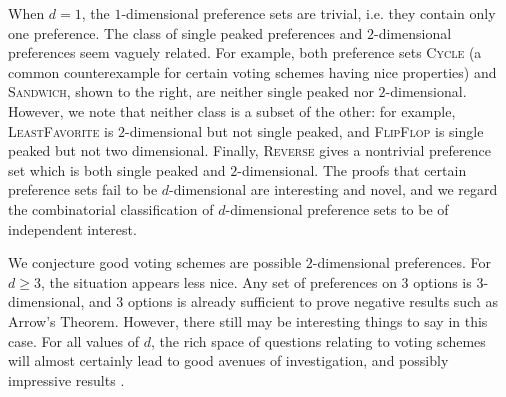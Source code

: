 \documentclass[12pt]{article}
\newcommand{\1}[1]{\mathds{1}[{#1}]}
\begin{document}
  When $d=1$, the $1$-dimensional preference sets are trivial,
  i.e. they contain only one preference.
  The class of single peaked preferences and $2$-dimensional preferences
  seem vaguely related.
  For example, both preference sets \textsc{Cycle} (a common counterexample
  for certain voting schemes having nice properties) and \textsc{Sandwich},
  shown to the right, are neither single peaked nor $2$-dimensional.
  However, we note that neither class is a subset of the other:
  for example, \textsc{LeastFavorite} is $2$-dimensional but not single peaked,
  and \textsc{FlipFlop} is single peaked but not two dimensional.
  Finally, \textsc{Reverse} gives a nontrivial preference set which
  is both single peaked and $2$-dimensional.
  The proofs that certain preference sets fail to be $d$-dimensional
  are interesting and novel, and we regard the combinatorial classification
  of $d$-dimensional preference sets to be of independent interest.

  We conjecture good voting schemes are possible $2$-dimensional preferences.
  For $d\ge 3$, the situation appears less nice.
  Any set of preferences on $3$ options is $3$-dimensional,
  and $3$ options is already sufficient to prove negative
  results such as Arrow's Theorem.
  However, there still may be interesting things to say in this case.
  For all values of $d$, the rich space of questions relating to
  voting schemes will almost certainly lead to good avenues of investigation,
  and possibly impressive results \cite{MattConversation}.

  \clearpage
  {}
  
\end{document}
